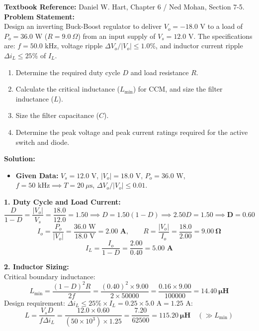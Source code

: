 \documentclass[10pt,a4paper]{article}
\begin{document}
\begin{tcolorbox}[qbox, title={Question 15: Buck-Boost Converter Design --- Component Sizing \& Device Ratings}]
\textbf{Textbook Reference:} Daniel W. Hart, Chapter 6 / Ned Mohan, Section 7-5.\\[1mm]
\textbf{Problem Statement:}\\
Design an inverting Buck-Boost regulator to deliver $V_o = -18.0\text{ V}$ to a load of $P_o = 36.0\text{ W}$ ($R = 9.0\ \Omega$) from an input supply of $V_s = 12.0\text{ V}$.
The specifications are: $f = 50.0\text{ kHz}$, voltage ripple $\Delta V_o / |V_o| \le 1.0\%$, and inductor current ripple $\Delta i_L \le 25\%$ of $I_L$.
\begin{enumerate}
  \item Determine the required duty cycle $D$ and load resistance $R$.
  \item Calculate the critical inductance ($L_{\min}$) for CCM, and size the filter inductance ($L$).
  \item Size the filter capacitance ($C$).
  \item Determine the peak voltage and peak current ratings required for the active switch and diode.
\end{enumerate}
\end{tcolorbox}

\vspace{1mm}
\noindent\textbf{\textcolor{accentteal}{Solution:}}
\begin{itemize}
  \item \textbf{Given Data:} $V_s = 12.0\text{ V}$, $|V_o| = 18.0\text{ V}$, $P_o = 36.0\text{ W}$, $f = 50\text{ kHz} \implies T = 20\ \mu\text{s}$, $\Delta V_o / |V_o| \le 0.01$.
\end{itemize}

\noindent\textbf{1. Duty Cycle and Load Current:}\\
\[
\frac{D}{1 - D} = \frac{|V_o|}{V_s} = \frac{18.0}{12.0} = 1.50 \implies D = 1.50(1 - D) \implies 2.50 D = 1.50 \implies \mathbf{D = 0.60}
\]
\[
I_o = \frac{P_o}{|V_o|} = \frac{36.0\text{ W}}{18.0\text{ V}} = \mathbf{2.00\text{ A}}, \qquad R = \frac{|V_o|}{I_o} = \frac{18.0}{2.00} = \mathbf{9.00\ \Omega}
\]
\[
I_L = \frac{I_o}{1 - D} = \frac{2.00}{0.40} = \mathbf{5.00\text{ A}}
\]

\noindent\textbf{2. Inductor Sizing:}\\
Critical boundary inductance:
\[
L_{\min} = \frac{(1 - D)^2 R}{2 f} = \frac{(0.40)^2 \times 9.00}{2 \times 50000} = \frac{0.16 \times 9.00}{100000} = \mathbf{14.40\ \mu\text{H}}
\]
Design requirement: $\Delta i_L \le 25\% \times I_L = 0.25 \times 5.0\text{ A} = 1.25\text{ A}$:
\[
L = \frac{V_s D}{f \Delta i_L} = \frac{12.0 \times 0.60}{(50 \times 10^3) \times 1.25} = \frac{7.20}{62500} = \mathbf{115.20\ \mu\text{H}} \quad (\gg L_{\min})
\]
\end{document}
